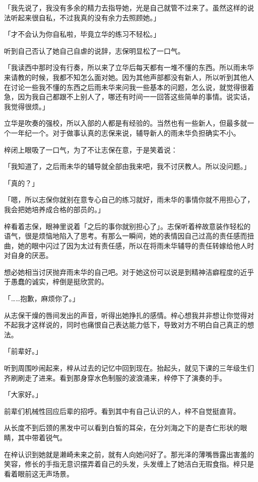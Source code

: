 \documentclass[UTF8]{ctexart}
\begin{document}
    「我先说了，我没有多余的精力去指导她，光是自己就管不过来了。虽然这样的说法听起来很自私，不过我真的没有余力去照顾她。」

    「才不会认为你自私啦，毕竟立华的练习不轻松。」

    听到自己否认了她自己自虐的说辞，志保明显松了一口气。

    「我读西中那时没有行奏，所以来了立华后每天都有一堆不懂的东西。所以雨未华来请教的时候，我都不知怎么面对她。因为其他声部都没有新人，所以听到其他人在讨论一些我不懂的东西之后雨未华来问我一些基本的问题，怎么说，就觉得很着急，因为我自己都跟不上别人了，哪还有时间一一回答这些简单的事情。说实话，我觉得很烦。」

    立华是吹奏的强校，所以入部的人都是有经验的。当然也有一些新人，但最多就一个一年纪一个。对于做事认真的志保来说，辅导新人的雨未华负担确实不小。

    梓闭上眼吸了一口气，为了不让志保在意，于是笑着说：

    「我知道了，之后雨未华的辅导就全部由我来吧，我不讨厌教人。所以没问题。」

    「真的？」

    「嗯，所以志保你就别在意专心自己的练习就好，雨未华的事情你就不用担心了，我会把她培养成合格的部员的。」

    梓看着志保，眼神里说着「之后的事你就别担心了」。志保听着梓故意装作轻松的语气，很是烦恼地陷入了思考。有那么一瞬间，她的表情因自己过高的责任感而扭曲，她的眼中闪过了因为太过有责任感，所以在将雨未华辅导的责任转嫁给他人时对自身的厌恶。

    想必她相当讨厌抛弃雨未华的自己吧。对于她这份可以说是到精神洁癖程度的近乎于愚蠢的诚实，梓倒是挺欣赏的。

    「……抱歉，麻烦你了。」

    从志保干燥的唇间发出的声音，听得出她挣扎的感情。梓心想我并非想让你觉得对不起我才这样说的，同时也痛恨自己表达能力低下，导致对方不明白自己真正的想法。

    「前辈好。」

    听到周围吵闹起来，梓从过去的记忆中回到现在。抬起头，就见下课的三年级生们齐刷刷走了进来。看到那身穿水色制服的波浪涌来，梓停下了演奏的手。

    「大家好。」

    前辈们机械性回应后辈的招呼。看到其中有自己认识的人，梓不自觉挺直背。

    从长度不到后颈的黑发中可以看到白皙的耳朵，在分刘海之下的是杏仁形状的眼睛，其中带着锐气。

    在梓认识到她就是濑崎未来之前，就有人向她问好了。那光泽的薄嘴唇露出害羞的笑容，修长的手指无意识摆弄着自己的头发，头发缠上了她洁白无瑕食指。梓只是看着眼前这无声场景。
\end{document}
